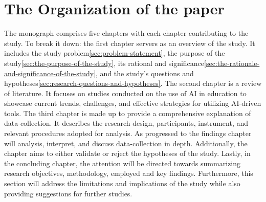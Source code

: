 \section{The Organization of the paper}\label{sec:the-organization-of-the-paper}
\justifying
The monograph comprises five chapters with each chapter contributing to the study.
To break it down:
the first chapter servers as an overview of the study.
It includes the study problem\ref{sec:problem-statement}, the purpose of the study\ref{sec:the-purpose-of-the-study},
its rational and significance\ref{sec:the-rationale-and-significance-of-the-study},
and the study's questions and hypotheses\ref{sec:research-questions-and-hypotheses}.
The second chapter is a review of literature.
It focuses on studies conducted on the use of AI in education
to showcase current trends, challenges, and effective strategies
for utilizing AI-driven tools.
The third chapter is made up to provide a comprehensive explanation of data-collection.
It describes the research design, participants, instrument, and relevant procedures
adopted for analysis.
As progressed to the findings chapter will analysis, interpret, and discuss data-collection in depth.
Additionally, the chapter aims to either validate or reject the hypotheses of the study.
Lastly, in the concluding chapter, the attention will be directed
towards summarizing research objectives, methodology, employed
and key findings.
Furthermore, this section will address the limitations and
implications of the study while also providing suggestions
for further studies.



